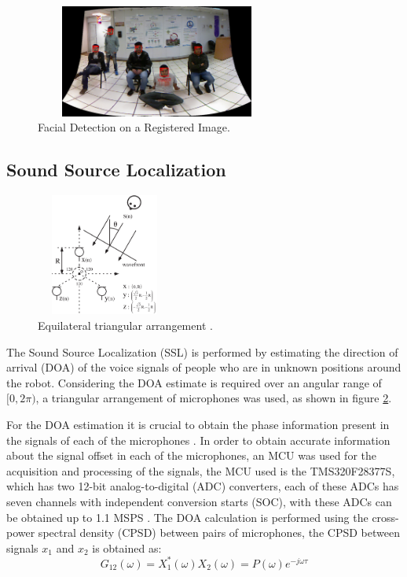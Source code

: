 \documentclass{llncs}
\begin{document}
\begin{figure}[h]
	\centering
	\includegraphics[angle=0, height=3.7cm, width=8cm]{Figures/sceneComplete_pano.png}
	\caption{Facial Detection on a Registered Image.}
	\label{pano_image}
\end{figure}


 


\subsection{Sound Source Localization}\label{subsec:SoundSource}

\begin{figure}
	\includegraphics[angle=0, height= 4cm, width= 4.5cm]{Figures/array.png}
	\caption{Equilateral triangular arrangement \cite{hioka2003}.}
	\label{F_array}
\end{figure}
The Sound Source Localization (SSL) is performed by estimating the direction of arrival (DOA) of the voice signals of people who are in unknown positions around the robot. Considering the DOA estimate is required over an angular range of $[0,2\pi)$, a triangular arrangement of microphones was used, as shown in figure \ref{F_array}.



For the DOA estimation it is crucial to obtain the phase information present in the signals of each of the microphones \cite{karbasi2006}. In order to obtain accurate information about the signal offset in each of the microphones, an MCU was used for the acquisition and processing of the signals, the MCU used is the TMS320F28377S, which has two 12-bit analog-to-digital (ADC) converters, each of these ADCs has seven channels with independent conversion starts (SOC), with these ADCs can be obtained up to 1.1 MSPS \cite{DTASHT2}. The DOA calculation is performed using the cross-power spectral density (CPSD) between pairs of microphones, the CPSD between signals  $x_1$ and $x_2$ is obtained as:
\begin{equation}
	G_{12}(\omega) = X_1^{*}(\omega) X_2(\omega) = P(\omega)e^{-j\omega \tau}
\end{equation} 
\end{document}
